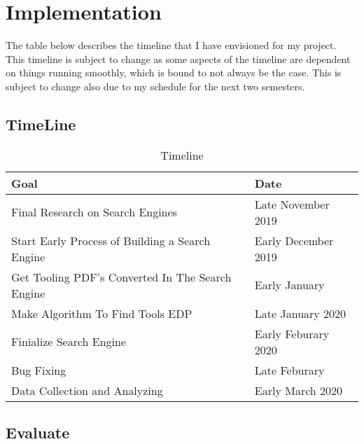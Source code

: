 %
%
%
\chapter{Implementation}\label{ch:implem}

The table below describes the timeline that I have envisioned for my project.
This timeline is subject to change as some aspects of the timeline are dependent
on things running smoothly, which is bound to not always be the case. This is
subject to change also due to my schedule for the next two semesters.

\section{TimeLine}

\begin{table}[htbp]
 \centering
 \begin{tabular}{|l|l|}
 \hline
   {\textbf{Goal}}  &  {\textbf{Date}} \\ \hline
   Final Research on Search Engines &   Late November 2019    \\ \hline
   Start Early Process of Building a Search Engine & Early December 2019    \\ \hline
   Get Tooling PDF's Converted In The Search Engine &  Early January  \\ \hline
   Make Algorithm To Find Tools EDP &  Late January 2020    \\ \hline
   Finialize Search Engine &  Early Feburary 2020    \\ \hline
   Bug Fixing &  Late Feburary   \\ \hline
   Data Collection and Analyzing & Early March 2020 \\ \hline
 \end{tabular}
\caption{Timeline}
\label{latexprocess}
\end{table}


\section{Evaluate}


